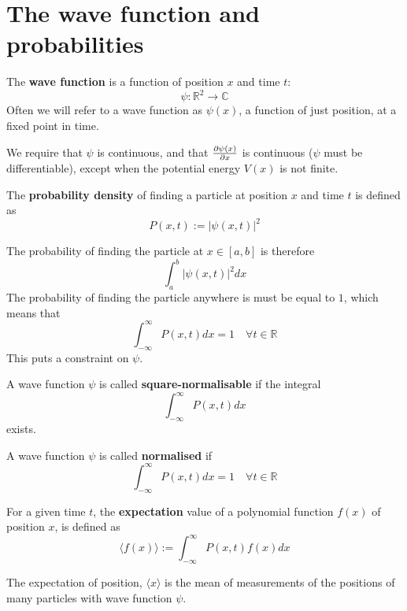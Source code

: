 \section{The wave function and probabilities}

\begin{definition}
	The \textbf{wave function} is a function of position $x$ and time $t$:
	\[
		\psi: \mathbb{R}^2 \rightarrow \mathbb{C}
	\]
	Often we will refer to a wave function as $\psi(x)$, a function of just position, at a fixed point in time.
\end{definition}

\begin{remark}
	We require that $\psi$ is continuous, and that $\diffp{\psi(x)}{x}$ is continuous ($\psi$ must be differentiable), except when the potential energy $V(x)$ is not finite. 
\end{remark}

\begin{definition}
	The \textbf{probability density} of finding a particle at position $x$ and time $t$ is defined as
	\[
		P(x, t) := |\psi(x, t)|^2
	\]

	The probability of finding the particle at $x \in [a, b]$ is therefore
	\[
		\int_a^b |\psi(x, t)|^2 dx
	\]
	The probability of finding the particle anywhere is must be equal to $1$, which means that
	\[
		\int_{-\infty}^{\infty} P(x, t) dx = 1 \quad \forall t \in \mathbb{R}
	\]
	This puts a constraint on $\psi$.
\end{definition}

\begin{definition}
	A wave function $\psi$ is called \textbf{square-normalisable} if the integral
	\[
		\int_{-\infty}^{\infty} P(x, t) dx
	\]
	exists.
\end{definition}

\begin{definition}
	A wave function $\psi$ is called \textbf{normalised} if
	\[
		\int_{-\infty}^{\infty} P(x, t) dx = 1 \quad \forall t \in \mathbb{R}	
	\]
\end{definition}

\begin{definition}
	For a given time $t$, the \textbf{expectation} value of a polynomial function $f(x)$ of position $x$, is defined as
	\[
		\langle f(x) \rangle := \int_{-\infty}^{\infty} P(x, t) f(x) dx
	\]
\end{definition}

\begin{remark}
	The expectation of position, $\langle x \rangle$ is the mean of measurements of the positions of many particles with wave function $\psi$.
\end{remark}

